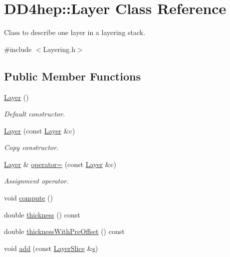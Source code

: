 \hypertarget{class_d_d4hep_1_1_layer}{}\section{D\+D4hep\+:\+:Layer Class Reference}
\label{class_d_d4hep_1_1_layer}


Class to describe one layer in a layering stack.  




{\ttfamily \#include $<$Layering.\+h$>$}

\subsection*{Public Member Functions}
\begin{DoxyCompactItemize}
\item 
\hyperlink{class_d_d4hep_1_1_layer_a23e603ff080b2c6e9a9016b401fdac20}{Layer} ()
\begin{DoxyCompactList}\small\item\em Default constructor. \end{DoxyCompactList}\item 
\hyperlink{class_d_d4hep_1_1_layer_ad051c4b9774da0a2196045ef138d59b4}{Layer} (const \hyperlink{class_d_d4hep_1_1_layer}{Layer} \&c)
\begin{DoxyCompactList}\small\item\em Copy constructor. \end{DoxyCompactList}\item 
\hyperlink{class_d_d4hep_1_1_layer}{Layer} \& \hyperlink{class_d_d4hep_1_1_layer_adc08802cc74ff34cb73d593b79181394}{operator=} (const \hyperlink{class_d_d4hep_1_1_layer}{Layer} \&c)
\begin{DoxyCompactList}\small\item\em Assignment operator. \end{DoxyCompactList}\item 
void \hyperlink{class_d_d4hep_1_1_layer_a7353fc97976976a6d739e37af18954de}{compute} ()
\item 
double \hyperlink{class_d_d4hep_1_1_layer_af07f933bdb0616eed97ebe0a217b1f52}{thickness} () const
\item 
double \hyperlink{class_d_d4hep_1_1_layer_ad5a2a4de75ac3a5487fb9d2340cb815a}{thickness\+With\+Pre\+Offset} () const
\item 
void \hyperlink{class_d_d4hep_1_1_layer_a0e2f64de27f1eae32c830a83df7793ed}{add} (const \hyperlink{class_d_d4hep_1_1_layer_slice}{Layer\+Slice} \&\hyperlink{_volumes_8cpp_a17ca6bfc8040d695d3cada22a4763d40}{s})
\end{DoxyCompactItemize}
